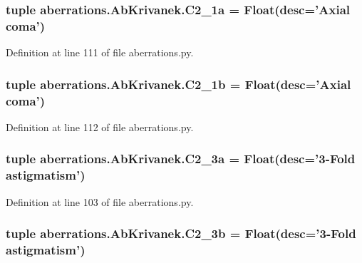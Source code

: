 \hypertarget{classaberrations_1_1_ab_krivanek_a6dcdbacc8d723b2a55c3236b1982af95}{
\subsubsection[{C2\-\_\-1a}]{\setlength{\rightskip}{0pt plus 5cm}tuple aberrations.\-Ab\-Krivanek.\-C2\-\_\-1a = Float(desc='Axial coma')\hspace{0.3cm}{\ttfamily [static]}}}\label{classaberrations_1_1_ab_krivanek_a6dcdbacc8d723b2a55c3236b1982af95}


Definition at line 111 of file aberrations.\-py.

\hypertarget{classaberrations_1_1_ab_krivanek_a827343cc3727f0f4d64d99051f79ca9f}{
\subsubsection[{C2\-\_\-1b}]{\setlength{\rightskip}{0pt plus 5cm}tuple aberrations.\-Ab\-Krivanek.\-C2\-\_\-1b = Float(desc='Axial coma')\hspace{0.3cm}{\ttfamily [static]}}}\label{classaberrations_1_1_ab_krivanek_a827343cc3727f0f4d64d99051f79ca9f}


Definition at line 112 of file aberrations.\-py.

\hypertarget{classaberrations_1_1_ab_krivanek_ab60aea624cb5d86337e8bd6dfd7ef20f}{
\subsubsection[{C2\-\_\-3a}]{\setlength{\rightskip}{0pt plus 5cm}tuple aberrations.\-Ab\-Krivanek.\-C2\-\_\-3a = Float(desc='3-\/Fold astigmatism')\hspace{0.3cm}{\ttfamily [static]}}}\label{classaberrations_1_1_ab_krivanek_ab60aea624cb5d86337e8bd6dfd7ef20f}


Definition at line 103 of file aberrations.\-py.

\hypertarget{classaberrations_1_1_ab_krivanek_ae1f00d8d6fcc1ec3676653a619bc9466}{
\subsubsection[{C2\-\_\-3b}]{\setlength{\rightskip}{0pt plus 5cm}tuple aberrations.\-Ab\-Krivanek.\-C2\-\_\-3b = Float(desc='3-\/Fold astigmatism')\hspace{0.3cm}{\ttfamily [static]}}}\label{classaberrations_1_1_ab_krivanek_ae1f00d8d6fcc1ec3676653a619bc9466}


